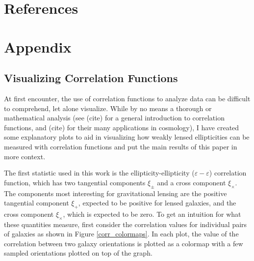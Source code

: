 \documentclass[%
 reprint,
 amsmath,amssymb,
 aps,nofootinbib
]{revtex4-1}
\begin{document}
\section{References}





\section{Appendix}

\subsection{Visualizing Correlation Functions}

At first encounter, the use of correlation functions to analyze data can be difficult to comprehend, let alone visualize. While by no means a thorough or mathematical analysis (see (cite) for a general introduction to correlation functions, and (cite) for their many applications in cosmology), I have created some explanatory plots to aid in visualizing how weakly lensed ellipticities can be measured with correlation functions and put the main results of this paper in more context.

The first statistic used in this work is the ellipticity-ellipticity ($\varepsilon-\varepsilon$) correlation function, which has two tangential components $\xi_\pm$ and a cross component $\xi_\times$. The components most interesting for gravitational lensing are the positive tangential component $\xi_+$, expected to be positive for lensed galaxies, and the cross component $\xi_\times$, which is expected to be zero. To get an intuition for what these quantities measure, first consider the correlation values for individual pairs of galaxies as shown in Figure \ref{corr_colormaps}. In each plot, the value of the correlation between two galaxy orientations is plotted as a colormap with a few sampled orientations plotted on top of the graph.
\end{document}
